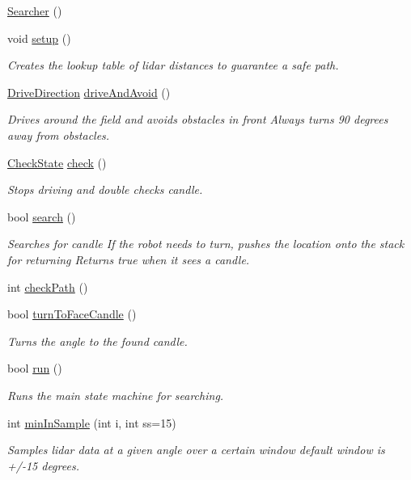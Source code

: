 \begin{DoxyCompactItemize}
\item 
\hyperlink{classSearcher_a46e9a9fa3aad21131cf6bd25237e3a80}{Searcher} ()
\item 
void \hyperlink{classSearcher_a8de47195c81aefbc9e2c3f9bf3a082fa}{setup} ()
\begin{DoxyCompactList}\small\item\em Creates the lookup table of lidar distances to guarantee a safe path. \end{DoxyCompactList}\item 
\hyperlink{DriveMotor_8hpp_a077d9d13989efa3142086ea83cbb1e68}{Drive\-Direction} \hyperlink{classSearcher_ae2933c43728ef6783d0e793cb23ab5f6}{drive\-And\-Avoid} ()
\begin{DoxyCompactList}\small\item\em Drives around the field and avoids obstacles in front Always turns 90 degrees away from obstacles. \end{DoxyCompactList}\item 
\hyperlink{classSearcher_a2c16b7eb56e090a7b832da7f2c9d5e9c}{Check\-State} \hyperlink{classSearcher_ad730a64dfa33bd178841c8bad64bc27a}{check} ()
\begin{DoxyCompactList}\small\item\em Stops driving and double checks candle. \end{DoxyCompactList}\item 
bool \hyperlink{classSearcher_ac568e6ce4cd7ca5c0b9283ab240e6537}{search} ()
\begin{DoxyCompactList}\small\item\em Searches for candle If the robot needs to turn, pushes the location onto the stack for returning Returns true when it sees a candle. \end{DoxyCompactList}\item 
int \hyperlink{classSearcher_ac541c9bafe6431e5fbf5b7e9c754b56a}{check\-Path} ()
\item 
bool \hyperlink{classSearcher_a557322c3deb361501d199b541ca7fdd3}{turn\-To\-Face\-Candle} ()
\begin{DoxyCompactList}\small\item\em Turns the angle to the found candle. \end{DoxyCompactList}\item 
bool \hyperlink{classSearcher_aaea092416ef215eb96f46ef3d6f1b581}{run} ()
\begin{DoxyCompactList}\small\item\em Runs the main state machine for searching. \end{DoxyCompactList}\item 
int \hyperlink{classSearcher_a72f0af23bc595eaa70e4fb017eac8d79}{min\-In\-Sample} (int i, int ss=15)
\begin{DoxyCompactList}\small\item\em Samples lidar data at a given angle over a certain window default window is +/-\/15 degrees. \end{DoxyCompactList}\end{DoxyCompactItemize}
